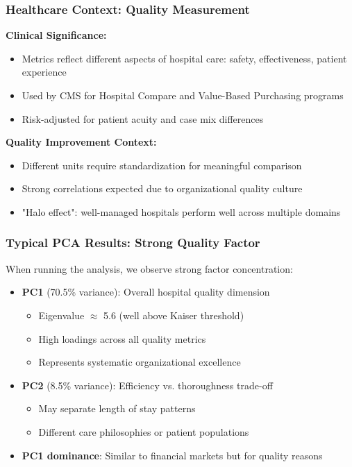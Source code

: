 \documentclass[aspectratio=169]{beamer}
\begin{document}
\begin{frame}
    \frametitle{Healthcare Context: Quality Measurement}
    \textbf{Clinical Significance:}
    \begin{itemize}
        \item Metrics reflect different aspects of hospital care: safety, effectiveness, patient experience \pause
        \item Used by CMS for Hospital Compare and Value-Based Purchasing programs \pause
        \item Risk-adjusted for patient acuity and case mix differences \pause
    \end{itemize}
    \vspace{12pt}
    \textbf{Quality Improvement Context:}
    \begin{itemize}
        \item Different units require standardization for meaningful comparison \pause
        \item Strong correlations expected due to organizational quality culture \pause
        \item "Halo effect": well-managed hospitals perform well across multiple domains \pause
    \end{itemize}
\end{frame}

\begin{frame}
    \frametitle{Typical PCA Results: Strong Quality Factor}
    When running the analysis, we observe strong factor concentration:
    \begin{itemize}
        \item \textbf{PC1} (70.5\% variance): Overall hospital quality dimension \pause
              \begin{itemize}
                  \item Eigenvalue $\approx$ 5.6 (well above Kaiser threshold) \pause
                  \item High loadings across all quality metrics \pause
                  \item Represents systematic organizational excellence \pause
              \end{itemize}
        \item \textbf{PC2} (8.5\% variance): Efficiency vs. thoroughness trade-off \pause
              \begin{itemize}
                  \item May separate length of stay patterns \pause
                  \item Different care philosophies or patient populations \pause
              \end{itemize}
        \item \textbf{PC1 dominance}: Similar to financial markets but for quality reasons \pause
    \end{itemize}
\end{frame}
\end{document}
